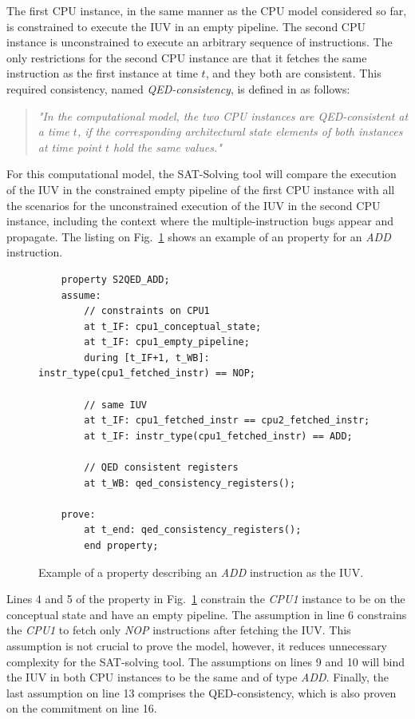 The first CPU instance, in the same manner as the CPU model considered so far, is constrained to execute the IUV in an empty pipeline. The second CPU instance is unconstrained to execute an arbitrary sequence of instructions. The only restrictions for the second CPU instance are that it fetches the same instruction as the first instance at time $t$, and they both are consistent. This required consistency, named \textit{QED-consistency}, is defined in \cite{paper-gapfree} as follows:

\begin{quote}
     \textit{"In the \SSQED{} computational model, the two CPU instances are QED-consistent at a time $t$, if the corresponding architectural state elements of both instances at time point $t$ hold the same values."}
\end{quote}

For this \SSQED{} computational model, the SAT-Solving tool will compare the execution of the IUV in the constrained empty pipeline of the first CPU instance with all the scenarios for the unconstrained execution of the IUV in the second CPU instance, including the context where the multiple-instruction bugs appear and propagate. The listing on Fig.~\ref{fig:ex-s2qed-add-ppt} shows an example of an \SSQED{} property for an \textit{ADD} instruction.

\begin{figure}[htb!]
    \begin{lstlisting}
    property S2QED_ADD;
    assume:
        // constraints on CPU1
        at t_IF: cpu1_conceptual_state;
        at t_IF: cpu1_empty_pipeline;
        during [t_IF+1, t_WB]: instr_type(cpu1_fetched_instr) == NOP;
    
        // same IUV
        at t_IF: cpu1_fetched_instr == cpu2_fetched_instr;
        at t_IF: instr_type(cpu1_fetched_instr) == ADD;
    
        // QED consistent registers
        at t_WB: qed_consistency_registers();
    
    prove:
        at t_end: qed_consistency_registers();
        end property;\end{lstlisting}
    \caption{Example of a \SSQED{} property describing an \textit{ADD} instruction as the IUV.}
    \label{fig:ex-s2qed-add-ppt}
\end{figure}

Lines 4 and 5 of the property in Fig.~\ref{fig:ex-s2qed-add-ppt} constrain the \textit{CPU1} instance to be on the conceptual state and have an empty pipeline. The assumption in line 6 constrains the \textit{CPU1} to fetch only \textit{NOP} instructions after fetching the IUV. This assumption is not crucial to prove the model, however, it reduces unnecessary complexity for the SAT-solving tool. The assumptions on lines 9 and 10 will bind the IUV in both CPU instances to be the same and of type \textit{ADD}. Finally, the last assumption on line 13 comprises the QED-consistency, which is also proven on the commitment on line 16.


